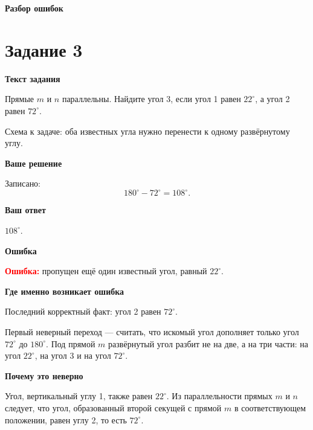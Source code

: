 \documentclass[12pt,a4paper]{article}
\newcommand{\errorlabel}{\textcolor{red}{\textbf{Ошибка:}}}
\newcommand{\subhead}[1]{\par\medskip\textbf{#1}\par}
\begin{document}
\newpage
\thispagestyle{reviewfooter}
\vspace*{\fill}
\begin{center}
{\LARGE\bfseries Разбор ошибок}
\end{center}
\vspace*{\fill}

\newpage
{}\label{task:3}
\section*{Задание 3}

\subhead{Текст задания}
Прямые $m$ и $n$ параллельны. Найдите угол 3, если угол 1 равен $22^\circ$, а угол 2 равен $72^\circ$.


\begin{center}

\small Схема к задаче: оба известных угла нужно перенести к одному развёрнутому углу.
\end{center}

\subhead{Ваше решение}
Записано:
\[
180^\circ-72^\circ=108^\circ.
\]

\subhead{Ваш ответ}
$108^\circ$.

\subhead{Ошибка}
\errorlabel{} пропущен ещё один известный угол, равный $22^\circ$.

\subhead{Где именно возникает ошибка}
Последний корректный факт: угол 2 равен $72^\circ$.

Первый неверный переход --- считать, что искомый угол дополняет только угол $72^\circ$ до $180^\circ$. Под прямой $m$ развёрнутый угол разбит не на две, а на три части: на угол $22^\circ$, на угол 3 и на угол $72^\circ$.

\subhead{Почему это неверно}
Угол, вертикальный углу 1, также равен $22^\circ$. Из параллельности прямых $m$ и $n$ следует, что угол, образованный второй секущей с прямой $m$ в соответствующем положении, равен углу 2, то есть $72^\circ$.
\end{document}
